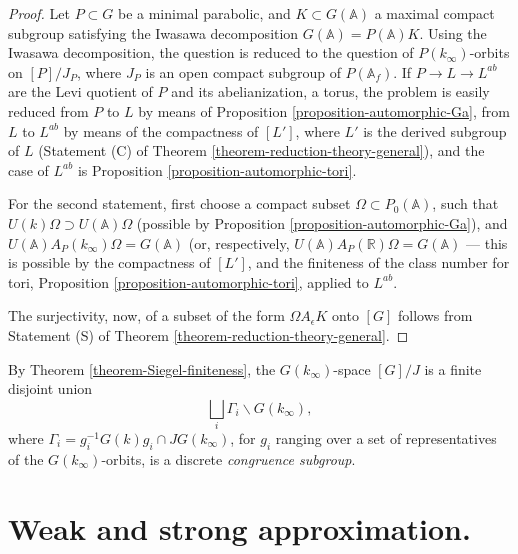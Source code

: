 \begin{proof}
Let $P\subset G$ be a minimal parabolic, and $K\subset G(\mathbb A)$ a maximal compact subgroup satisfying the Iwasawa decomposition $G(\mathbb A) = P(\mathbb A)K$. Using the Iwasawa decomposition, the question is reduced to the question of $P(k_\infty)$-orbits on $[P]/J_P$, where $J_P$ is an open compact subgroup of $P(\mathbb A_f)$. If $P\to L\to L^{ab}$ are the Levi quotient of $P$ and its abelianization, a torus, the problem is easily reduced from $P$ to $L$ by means of Proposition \ref{proposition-automorphic-Ga}, from $L$ to $L^{ab}$ by means of the compactness of $[L']$, where $L'$ is the derived subgroup of $L$ (Statement (C) of Theorem \ref{theorem-reduction-theory-general}), and the case of $L^{ab}$ is Proposition \ref{proposition-automorphic-tori}.

For the second statement, first choose a compact subset $\Omega\subset P_0(\mathbb A)$, such that $U(k)\Omega \supset U(\mathbb A)\Omega$ (possible by Proposition \ref{proposition-automorphic-Ga}), and $U(\mathbb A) A_P(k_\infty) \Omega = G(\mathbb A)$ (or, respectively, $U(\mathbb A) A_P(\mathbb R) \Omega = G(\mathbb A)$ --- this is possible by the compactness of $[L']$, and the finiteness of the class number for tori, Proposition \ref{proposition-automorphic-tori}, applied to $L^{ab}$.

The surjectivity, now, of a subset of the form $\Omega A_\epsilon K$ onto $[G]$ follows from Statement (S) of Theorem \ref{theorem-reduction-theory-general}.
\end{proof}

\begin{remark}
 \label{remark-Ginfty-orbits}
By Theorem \ref{theorem-Siegel-finiteness}, the $G(k_\infty)$-space $[G]/J$ is a finite disjoint union
$$ \bigsqcup_i \Gamma_i \backslash G(k_\infty),$$
where $\Gamma_i = g_i^{-1}G(k)g_i \cap JG(k_\infty)$, for $g_i$ ranging over a set of representatives of the $G(k_\infty)$-orbits, is a discrete \emph{congruence subgroup}. 

\end{remark}


\section{Weak and strong approximation.}
\label{section-approximation}


